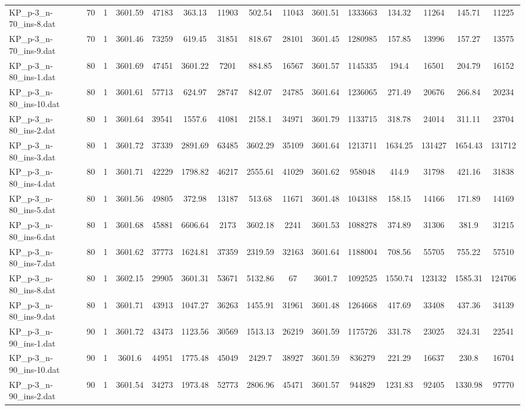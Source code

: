\begin{table}[!ht]
{\begin{tabular}{lcccccccccccccc}
KP\_p-3\_n-70\_ins-8.dat & 70 & 1 & 3601.59 & 47183 & 363.13 & 11903 & 502.54 & 11043 & 3601.51 & 1333663 & 134.32 & 11264 & 145.71 & 11225 \\
KP\_p-3\_n-70\_ins-9.dat & 70 & 1 & 3601.46 & 73259 & 619.45 & 31851 & 818.67 & 28101 & 3601.45 & 1280985 & 157.85 & 13996 & 157.27 & 13575 \\
KP\_p-3\_n-80\_ins-1.dat & 80 & 1 & 3601.69 & 47451 & 3601.22 & 7201 & 884.85 & 16567 & 3601.57 & 1145335 & 194.4 & 16501 & 204.79 & 16152 \\
KP\_p-3\_n-80\_ins-10.dat & 80 & 1 & 3601.61 & 57713 & 624.97 & 28747 & 842.07 & 24785 & 3601.64 & 1236065 & 271.49 & 20676 & 266.84 & 20234 \\
KP\_p-3\_n-80\_ins-2.dat & 80 & 1 & 3601.64 & 39541 & 1557.6 & 41081 & 2158.1 & 34971 & 3601.79 & 1133715 & 318.78 & 24014 & 311.11 & 23704 \\
KP\_p-3\_n-80\_ins-3.dat & 80 & 1 & 3601.72 & 37339 & 2891.69 & 63485 & 3602.29 & 35109 & 3601.64 & 1213711 & 1634.25 & 131427 & 1654.43 & 131712 \\
KP\_p-3\_n-80\_ins-4.dat & 80 & 1 & 3601.71 & 42229 & 1798.82 & 46217 & 2555.61 & 41029 & 3601.62 & 958048 & 414.9 & 31798 & 421.16 & 31838 \\
KP\_p-3\_n-80\_ins-5.dat & 80 & 1 & 3601.56 & 49805 & 372.98 & 13187 & 513.68 & 11671 & 3601.48 & 1043188 & 158.15 & 14166 & 171.89 & 14169 \\
KP\_p-3\_n-80\_ins-6.dat & 80 & 1 & 3601.68 & 45881 & 6606.64 & 2173 & 3602.18 & 2241 & 3601.53 & 1088278 & 374.89 & 31306 & 381.9 & 31215 \\
KP\_p-3\_n-80\_ins-7.dat & 80 & 1 & 3601.62 & 37773 & 1624.81 & 37359 & 2319.59 & 32163 & 3601.64 & 1188004 & 708.56 & 55705 & 755.22 & 57510 \\
KP\_p-3\_n-80\_ins-8.dat & 80 & 1 & 3602.15 & 29905 & 3601.31 & 53671 & 5132.86 & 67 & 3601.7 & 1092525 & 1550.74 & 123132 & 1585.31 & 124706 \\
KP\_p-3\_n-80\_ins-9.dat & 80 & 1 & 3601.71 & 43913 & 1047.27 & 36263 & 1455.91 & 31961 & 3601.48 & 1264668 & 417.69 & 33408 & 437.36 & 34139 \\
KP\_p-3\_n-90\_ins-1.dat & 90 & 1 & 3601.72 & 43473 & 1123.56 & 30569 & 1513.13 & 26219 & 3601.59 & 1175726 & 331.78 & 23025 & 324.31 & 22541 \\
KP\_p-3\_n-90\_ins-10.dat & 90 & 1 & 3601.6 & 44951 & 1775.48 & 45049 & 2429.7 & 38927 & 3601.59 & 836279 & 221.29 & 16637 & 230.8 & 16704 \\
KP\_p-3\_n-90\_ins-2.dat & 90 & 1 & 3601.54 & 34273 & 1973.48 & 52773 & 2806.96 & 45471 & 3601.57 & 944829 & 1231.83 & 92405 & 1330.98 & 97770 \\

\end{tabular}}
\end{table}
